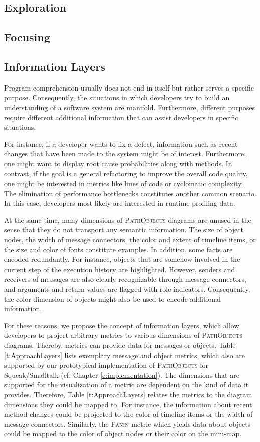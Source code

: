 \subsection{Exploration}
\subsection{Focusing}

\subsection{Information Layers}
Program comprehension usually does not end in itself but rather serves a specific purpose.
Consequently, the situations in which developers try to build an understanding of a software system are manifold.
Furthermore, different purposes require different additional information that can assist developers in specific situations.

For instance, if a developer wants to fix a defect, information such as recent changes that have been made to the system might be of interest.
Furthermore, one might want to display root cause probabilities along with methods.
In contrast, if the goal is a general refactoring to improve the overall code quality, one might be interested in metrics like lines of code or cyclomatic complexity.
The elimination of performance bottlenecks constitutes another common scenario.
In this case, developers most likely are interested in runtime profiling data.

At the same time, many dimensions of \textsc{PathObjects} diagrams are unused in the sense that they do not transport any semantic information.
The size of object nodes, the width of message connectors, the color and extent of timeline items, or the size and color of fonts constitute examples.
In addition, some facts are encoded redundantly.
For instance, objects that are somehow involved in the current step of the execution history are highlighted.
However, senders and receivers of messages are also clearly recognizable through  message connectors, and arguments and return values are flagged with role indicators.
Consequently, the color dimension of objects might also be used to encode additional information.

For these reasons, we propose the concept of information layers, which allow developers to project arbitrary metrics to various dimensions of \textsc{PathObjects} diagrams.
Thereby, metrics can provide data for messages or objects.
Table \ref{t:ApproachLayers} lists exemplary message and object metrics, which also are supported by our prototypical implementation of \textsc{PathObjects} for Squeak/Smalltalk (cf. Chapter \ref{c:implementation}).
The dimensions that are supported for the visualization of a metric are dependent on the kind of data it provides.
Therefore, Table \ref{t:ApproachLayers} relates the metrics to the diagram dimensions they could be mapped to.
For instance, the information about recent method changes could be projected to the color of timeline items or the width of message connectors.
Similarly, the \textsc{Fanin} metric which yields data about objects could be mapped to the color of object nodes or their color on the mini-map.

